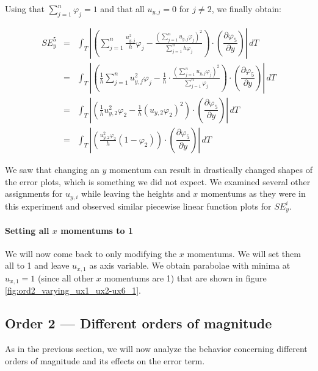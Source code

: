 \documentclass[a4paper, twoside]{article}
\newcommand{\pd}[2]{\dfrac{\partial #1}{\partial #2}}
\renewcommand{\phi}{\varphi}
\begin{document}
Using that $\sum_{j=1}^n \phi_j = 1$ and that all $u_{y,j} = 0$ for $j \neq 2$, we finally obtain:

\begin{eqnarray*}
  SE_y^5 & = & \int_T \left| \left( \sum_{j=1}^n \frac{u_{y,j}^2}{h} \phi_j - \frac{\left(\sum_{j=1}^n u_{y,j}\phi_j\right)^2}{\sum_{j=1}^n h\phi_j} \right) \cdot \left(\pd{\phi_5}{y}\right) \right|\, dT \\
  {} & = & \int_T \left| \left( \frac{1}{h} \sum_{j=1}^n u_{y,j}^2 \phi_j - \frac{1}{h} \cdot \frac{\left(\sum_{j=1}^n u_{y,j}\phi_j\right)^2}{\sum_{j=1}^n \phi_j} \right) \cdot \left(\pd{\phi_5}{y}\right) \right|\, dT \\
{} & = & \int_T \left| \left( \frac{1}{h} u_{y,2}^2 \phi_2 - \frac{1}{h} \left(u_{y,2}\phi_2\right)^2 \right) \cdot \left(\pd{\phi_5}{y}\right) \right|\, dT \\
	{} & = & \int_T \left| \left( \frac{u_{y,2}^2 \phi_2}{h} \left( 1 - \phi_2\right) \right) \cdot \left(\pd{\phi_5}{y}\right) \right|\, dT
\end{eqnarray*}

We saw that changing an $y$ momentum can result in drastically changed shapes of the error plots,  which is something we did not expect. We examined several other assignments for $u_{y,i}$ while leaving the heights and $x$ momentums as they were in this experiment and observed similar piecewise linear function plots for $SE_y^i$.

\paragraph{Setting all $x$ momentums to 1}

We will now come back to only modifying the $x$ momentums. We will set them all to 1 and leave $u_{x,1}$ as axis variable. We obtain parabolae with minima at $u_{x,1}=1$ (since all other $x$ momentums are 1) that are shown in figure \ref{fig:ord2_varying_ux1_ux2-ux6_1}.



\subsection{Order 2 --- Different orders of magnitude}
\label{sec:ord2-different-orders-magnitude}

As in the previous section, we will now analyze the behavior concerning different orders of magnitude and its effects on the error term.
\end{document}
